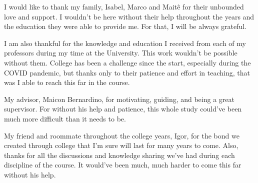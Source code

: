 \begin{agradecimentos}

  I would like to thank my family, Isabel, Marco and Maitê for their unbounded love and support. I wouldn't be here without their help throughout the years and the education they were able to provide me. For that, I will be always grateful.

  I am also thankful for the knowledge and education I received from each of my professors during my time at the University. This work wouldn't be possible without them. College has been a challenge since the start, especially during the COVID pandemic, but thanks only to their patience and effort in teaching, that was I able to reach this far in the course.

  My advisor, Maicon Bernardino, for motivating, guiding, and being a great supervisor. For without his help and patience, this whole study could've been much more difficult than it needs to be.

  My friend and roommate throughout the college years, Igor, for the bond we created through college that I'm sure will last for many years to come. Also, thanks for all the discussions and knowledge sharing we've had during each discipline of the course. It would've been much, much harder to come this far without his help.

\end{agradecimentos}